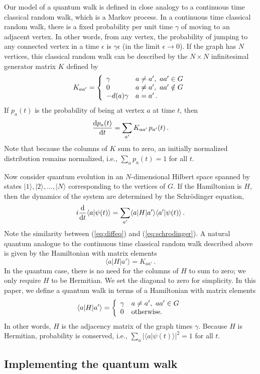 \documentclass[aps,11pt,twoside,nofootinbib,tightenlines,superscriptaddress,preprintnumbers]{revtex4}
\makeatletter
\newcommand{\<}{\langle}
\renewcommand{\>}{\rangle}
\newcommand{\be}{\begin{equation}}
\newcommand{\ee}{\end{equation}}
\newcommand{\cond}[1]{\left\{\begin{array}{l@{~~~}l}#1\end{array}\right.}
\renewcommand{\d}{{\mathrm{d}}}
\makeatother
\begin{document}
Our model of a quantum walk is defined in close analogy to a continuous
time classical random walk, which is a Markov process.  In a continuous
time classical random walk, there is a fixed probability per unit time
$\gamma$ of moving to an adjacent vertex.  In other words, from any
vertex, the probability of jumping to any connected vertex in a time
$\epsilon$ is $\gamma \epsilon$ (in the limit $\epsilon \to 0$).  If the
graph has $N$ vertices, this classical random walk can be described by the
$N \times N$ infinitesimal generator matrix $K$ defined by
\be
  K_{aa'} = \cond{ 
      \gamma       & a \ne a', \ aa' \in G \\
      0            & a \ne a', \ aa' \notin G \\
      -d(a) \gamma & a=a' \,.}
\ee
If $p_a(t)$ is the probability of being at vertex $a$ at time $t$, then
\be
  {\d p_a(t) \over \d t} = \sum_{a'} K_{aa'} \, p_{a'}(t)
\,.
\label{eq:diffeq}
\ee
Note that because the columns of $K$ sum to zero, an initially normalized
distribution remains normalized, i.e., $\sum_a p_a(t) = 1$ for all $t$.

Now consider quantum evolution in an $N$-dimensional Hilbert space spanned
by states $|1\>, |2\>, \ldots, |N\>$ corresponding to the vertices of $G$.
If the Hamiltonian is $H$, then the dynamics of the system are determined
by the Schr\"odinger equation,
\be
  i {{\mathrm d} \over {\mathrm d}t} \<a|\psi(t)\> 
    = \sum_{a'} \<a|H|a'\> \<a'|\psi(t)\>
\,.
\label{eq:schrodinger}
\ee
Note the similarity between (\ref{eq:diffeq}) and (\ref{eq:schrodinger}).
A natural quantum analogue to the continuous time classical random walk
described above is given by the Hamiltonian with matrix
elements~\cite{FG98}
\be
  \<a|H|a'\> = K_{aa'}
\,.
\label{eq:graphham1}
\ee
In the quantum case, there is no need for the columns of $H$ to sum to zero;
we only require $H$ to be Hermitian. We set the diagonal to zero
for simplicity.  In this paper, we define a quantum walk in terms of a
Hamiltonian with matrix elements
\be
  \<a|H|a'\> = \cond{ \gamma & a \ne a', \ aa' \in G \\
                      0      & \textrm{otherwise.} }
\label{eq:graphham}
\ee
In other words, $H$ is the adjacency matrix of the graph times $\gamma$.
Because $H$ is Hermitian, probability is conserved, i.e., $\sum_a
|\<a|\psi(t)\>|^2=1$ for all $t$.

\subsection{Implementing the quantum walk}\label{subsec:implement}
\end{document}
